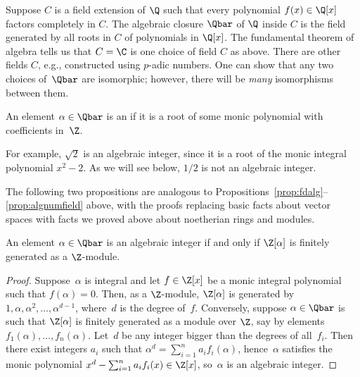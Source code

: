 Suppose $C$ is a field extension of $\Q$ such that every polynomial
$f(x)\in \Q[x]$ factors completely in $C$.
The algebraic closure $\Qbar$ of $\Q$ inside $C$
is the  field generated by all roots in $C$ of polynomials
in $\Q[x]$.
The fundamental theorem of algebra tells us that
$C=\C$ is one choice of field $C$ as above.
There are other fields $C$, e.g., constructed using $p$-adic numbers.
One can show that any two choices of~$\Qbar$ are isomorphic; however,
there will be {\em many} isomorphisms between them.

\begin{definition}
	An element $\alpha\in\Qbar$ is an  if it
	is a root of some monic polynomial with coefficients in~$\Z$.
\end{definition}
For example, $\sqrt{2}$ is an algebraic integer, since it is a root
of the monic integral polynomial $x^2-2$. As we will see below,
$1/2$ is not an algebraic integer.

The following two propositions are analogous to
Propositions~\ref{prop:fdalg}--\ref{prop:algnumfield} above, with
the proofs replacing basic facts about vector spaces with facts we
proved above about noetherian rings and modules.

\begin{proposition}
	\label{prop:intfg}
	An element $\alpha\in\Qbar$ is an algebraic integer if and
	only if $\Z[\alpha]$ is finitely generated as a $\Z$-module.
\end{proposition}
\begin{proof}
	Suppose~$\alpha$ is integral and let $f\in\Z[x]$ be a monic
	integral polynomial such that $f(\alpha)=0$.  Then, as a
	$\Z$-module, $\Z[\alpha]$ is generated by 
	$1,\alpha,\alpha^2,\ldots,\alpha^{d-1}$, where~$d$ is
	the degree of~$f$. Conversely, suppose $\alpha\in\Qbar$ is such
	that $\Z[\alpha]$ is finitely generated as a module over $\Z$,
	say by elements $f_1(\alpha), \ldots, f_n(\alpha)$. Let~$d$ be
	any integer bigger than the degrees of all~$f_i$. Then there exist
	integers $a_i$ such that $\alpha^d = \sum_{i=1}^n a_i f_i(\alpha)$,
	hence~$\alpha$ satisfies the monic polynomial
	$x^d - \sum_{i=1}^n a_i f_i(x) \in \Z[x]$, so~$\alpha$
	is an algebraic integer.
\end{proof}

